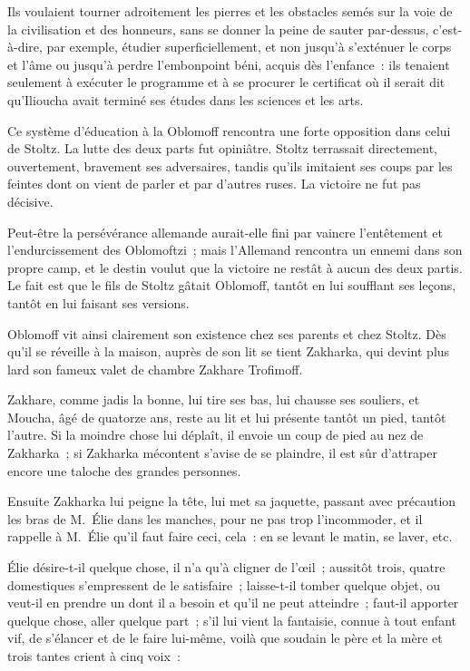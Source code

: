 \documentclass[french,twoside]{book} %
\begin{document}
Ils voulaient tourner adroitement les pierres et les obstacles semés sur la voie de la civilisation et des honneurs, sans se donner la peine de sauter par-dessus, c’est-à-dire, par exemple, étudier superficiellement, et non jusqu’à s’exténuer le corps et l’âme ou jusqu’à perdre l’embonpoint béni, acquis dès l’enfance : ils tenaient seulement à exécuter le programme et à se procurer le certificat où il serait dit qu’Ilioucha avait terminé ses études dans les sciences et les arts.\par
Ce système d’éducation à la Oblomoff rencontra une forte opposition dans celui de Stoltz. La lutte des deux parts fut opiniâtre. Stoltz terrassait directement, ouvertement, bravement ses adversaires, tandis qu’ils imitaient ses coups par les feintes dont on vient de parler et par d’autres ruses. La victoire ne fut pas décisive.\par
Peut-être la persévérance allemande aurait-elle fini par vaincre l’entêtement et l’endurcissement des Oblomoftzi ; mais l’Allemand rencontra un ennemi dans son propre camp, et le destin voulut que la victoire ne restât à aucun des deux partis. Le fait est que le fils de Stoltz gâtait Oblomoff, tantôt en lui soufflant ses leçons, tantôt en lui faisant ses versions.\par
Oblomoff vit ainsi clairement son existence chez ses parents et chez Stoltz. Dès qu’il se réveille à la maison, auprès de son lit se tient Zakharka, qui devint plus lard son fameux valet de chambre Zakhare Trofimoff.\par
Zakhare, comme jadis la bonne, lui tire ses bas, lui chausse ses souliers, et Moucha, âgé de quatorze ans, reste au lit et lui présente tantôt un pied, tantôt l’autre. Si la moindre chose lui déplaît, il envoie un coup de pied au nez de Zakharka ; si Zakharka mécontent s’avise de se plaindre, il est sûr d’attraper encore une taloche des grandes personnes.\par
Ensuite Zakharka lui peigne la tête, lui met sa jaquette, passant avec précaution les bras de M. Élie dans les manches, pour ne pas trop l’incommoder, et il rappelle à M. Élie qu’il faut faire ceci, cela : en se levant le matin, se laver, etc.\par
Élie désire-t-il quelque chose, il n’a qu’à cligner de l’œil ; aussitôt trois, quatre domestiques s’empressent de le satisfaire ; laisse-t-il tomber quelque objet, ou veut-il en prendre un dont il a besoin et qu’il ne peut atteindre ; faut-il apporter quelque chose, aller quelque part ; s’il lui vient la fantaisie, connue à tout enfant vif, de s’élancer et de le faire lui-même, voilà que soudain le père et la mère et trois tantes crient à cinq voix :\par
\end{document}
